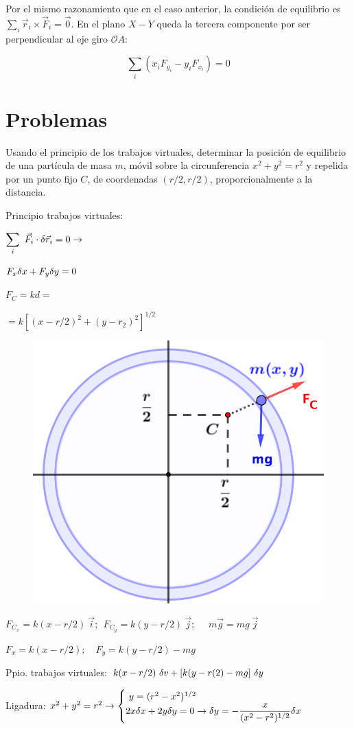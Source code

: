 Por el mismo razonamiento que en el caso anterior, la condición de equilibrio es $\displaystyle \sum_i \vec r_i \times \vec F_i=\vec 0$. En el plano $X-Y$ queda la tercera componente por ser perpendicular al eje giro  $\mathcal O A$:

$$\displaystyle \sum_i (x_iF_{y_i}-y_iF_{x_i})=0$$
 
 
 \section{Problemas}
 
 \begin{prob}
 	Usando el principio de los trabajos virtuales, determinar la posición de equilibrio de una partícula de masa $m$, móvil sobre la circunferencia $x^2+y^2=r^2$ y repelida por un punto fijo $C$, de coordenadas $(r/2,r/2)$, proporcionalmente a la distancia.
 \end{prob}

\begin{multicols}{2}
Principio trabajos virtuales:

$\displaystyle \sum_i \ \vec F_i \cdot \var \vec r_i = 0 \to$

$\displaystyle F_x \var x + F_y \var y =0$

$F_C=kd=$

$=k[(x-r/2)^2+(y-r_2)^2]^{1/2}$
\begin{figure}[H]
	\centering
	\includegraphics[width=.35\textwidth]{imagenes/imagenes06/T06IM08.png}
\end{figure}	
\end{multicols}

\vspace{-5mm} %
$F_{C_x}=k(x-r/2)\ \vec i;\ \ F_{C_y}=k(y-r/2)\ \vec j;$
$\quad m\vec g=mg\ \vec j$ 

$F_x=k(x-r/2);\quad F_y=k(y-r/2)-mg$

Ppio. trabajos virtuales: $k(x-r/2)\ \var v+[k(y-r(2)-mg]\ \var y$

Ligadura: $x^2+y^2=r^2 \to \begin{cases} \ y=(r^2-x^2)^{1/2} \\ 2x\var x+2y \var  y=0 \to \var y=-\dfrac x{(x^2-r^2)^{1/2}} \var x \end{cases}$

